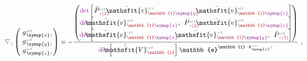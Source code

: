 \begin{align} \label{simplify6-V2'-SVA-Cramer}
	\mathcolor{gray}{\nabla_z} \begin{pmatrix} \xint{{}^{}_{\mathcolor{gray}{-}}}{10}{g}^{\;\!\mathcolor{gray}{\omega} \textcolor{PineGreen}{\imath}}_{\;\! \symup{x} \mathcolor{gray}{z}} \\ \xint{{}^{}_{\mathcolor{gray}{-}}}{10}{g}^{\;\!\mathcolor{gray}{\omega} \textcolor{PineGreen}{\imath}}_{\;\! \symup{y} \mathcolor{gray}{z}} \\ \xint{{}^{}_{\mathcolor{gray}{-}}}{10}{g}^{\;\!\mathcolor{gray}{\omega} \textcolor{PineGreen}{\imath}}_{\;\! \symup{z} \mathcolor{gray}{z}} \end{pmatrix} = - \frac{\begin{pmatrix} \textcolor{Plum}{\det} \left[ \xint{\mathcolor{gray}{-}}{24}{\bar{P}}^{\;\! \mathcolor{gray}{\omega} \textcolor{PineGreen}{\imath}}_{\;\! \mathcolor{gray}{z} \textcolor{Maroon}{(2)}},~ \xint{\mathcolor{gray}{-}}{25}{\bar{\mathsfit{v}}}^{\;\! \mathcolor{gray}{\omega} \textcolor{PineGreen}{\imath}}_{\textcolor{Maroon}{\mathbb{1}}\textcolor{Plum}{\symup{y}}},~ \xint{\mathcolor{gray}{-}}{25}{\bar{\mathsfit{v}}}^{\;\! \mathcolor{gray}{\omega} \textcolor{PineGreen}{\imath}}_{\textcolor{Maroon}{\mathbb{1}}\textcolor{Plum}{\symup{z}}} \right] \\ \textcolor{Plum}{\det} \left[ \xint{\mathcolor{gray}{-}}{25}{\bar{\mathsfit{v}}}^{\;\! \mathcolor{gray}{\omega} \textcolor{PineGreen}{\imath}}_{\textcolor{Maroon}{\mathbb{1}}\textcolor{Plum}{\symup{x}}},~ \xint{\mathcolor{gray}{-}}{24}{\bar{P}}^{\;\! \mathcolor{gray}{\omega} \textcolor{PineGreen}{\imath}}_{\;\! \mathcolor{gray}{z} \textcolor{Maroon}{(2)}},~ \xint{\mathcolor{gray}{-}}{25}{\bar{\mathsfit{v}}}^{\;\! \mathcolor{gray}{\omega} \textcolor{PineGreen}{\imath}}_{\textcolor{Maroon}{\mathbb{1}}\textcolor{Plum}{\symup{z}}} \right] \\ \textcolor{Plum}{\det} \left[ \xint{\mathcolor{gray}{-}}{25}{\bar{\mathsfit{v}}}^{\;\! \mathcolor{gray}{\omega} \textcolor{PineGreen}{\imath}}_{\textcolor{Maroon}{\mathbb{1}}\textcolor{Plum}{\symup{x}}},~ \xint{\mathcolor{gray}{-}}{25}{\bar{\mathsfit{v}}}^{\;\! \mathcolor{gray}{\omega} \textcolor{PineGreen}{\imath}}_{\textcolor{Maroon}{\mathbb{1}}\textcolor{Plum}{\symup{y}}},~ \xint{\mathcolor{gray}{-}}{24}{\bar{P}}^{\;\! \mathcolor{gray}{\omega} \textcolor{PineGreen}{\imath}}_{\;\! \mathcolor{gray}{z} \textcolor{Maroon}{(2)}} \right] \end{pmatrix}}{\textcolor{Plum}{\det} \left[ \xint{\mathcolor{gray}{-}}{25}{\bar{\bar{\mathsfit{V}}}}^{\;\! \mathcolor{gray}{\omega} \textcolor{PineGreen}{\imath}}_{\textcolor{Maroon}{\mathbb{1}}} \right] \mathbb{e}^{\mathbb{i} \xint{\begin{smallmatrix} ~ \\ {}^{}_{\mathcolor{gray}{-}} \\ ~ \end{smallmatrix}}{15}{k}_{\symup{z}}^{\;\! \mathcolor{gray}{\omega} \textcolor{PineGreen}{\imath}} \mathcolor{gray}{z}}} ~,
\end{align}
